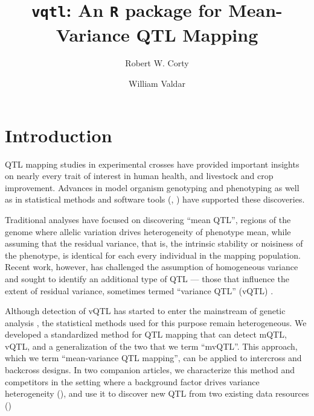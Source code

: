\documentclass[9pt,twocolumn,twoside]{gsag3jnl}
\title{\texttt{vqtl}: An \texttt{R} package for Mean-Variance QTL Mapping}
\author[$\ast$,1]{Robert W. Corty}
\author[$\ast, 1$]{William Valdar}
\affil[$\ast$]{University of North Carolina at Chapel Hill, Department of Genetics}
\begin{document}
\maketitle
\thispagestyle{firststyle}
\logomark
\articletypemark
\marginmark
\firstpagefootnote
{}
\vspace{-24pt}%



\section*{Introduction}

QTL mapping studies in experimental crosses have provided important insights on nearly every trait of interest in human health, and livestock and crop improvement.
Advances in model organism genotyping \citep{Williams1990} and phenotyping \citep{Yang2014a} as well as in statistical methods \citep{Lander1989a,Martinez1992} and software tools (\eg, \citealt{Broman2003,Mulligan2017}) have supported these discoveries.

Traditional analyses have focused on discovering ``mean QTL'', regions of the genome where allelic variation drives heterogeneity of phenotype mean, while assuming that the residual variance, that is, the intrinsic stability or noisiness of the phenotype, is identical for each every individual in the mapping population.
Recent work, however, has challenged the assumption of homogeneous variance and sought to identify an additional type of QTL --- those that
influence the extent of residual variance, sometimes termed ``variance QTL'' (vQTL) \citep{Pare2010,Ronnegard2011a,Ronnegard2012,Cao2014}.

Although detection of vQTL has started to enter the mainstream of genetic analysis \citep{Yang2012,Hulse2013,Ayroles2015,Wei2016-lt,Wang2017,Wei2017-tt}, the statistical methods used for this purpose remain heterogeneous.
We developed a standardized method for QTL mapping that can detect mQTL, vQTL, and a generalization of the two that we term ``mvQTL''.
This approach, which we term ``mean-variance QTL mapping'', can be applied to intercross and backcross designs.
In two companion articles, we characterize this method and competitors in the setting where a background factor drives variance heterogeneity (\CortyMethodsPaper), and use it to discover new QTL from two existing data resources (\CortyReanalysisPaper)
\end{document}
